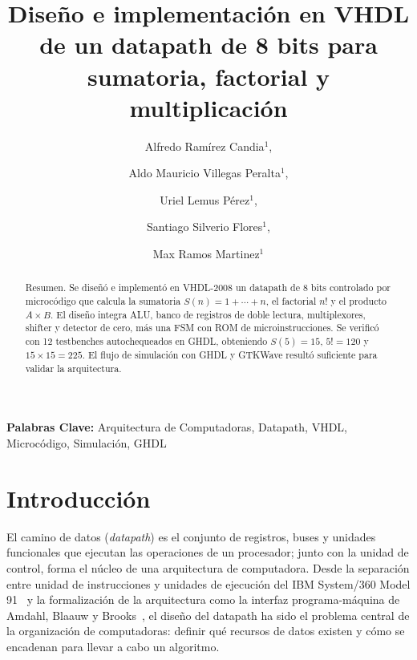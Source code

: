 \documentclass[llncs]{llncs}
\begin{document}
\title{Diseño e implementación en VHDL de un datapath
de 8 bits para sumatoria, factorial y multiplicación}

\author{Alfredo Ramírez Candia$^{1}$,%
\and Aldo Mauricio Villegas Peralta$^{1}$,%
\and Uriel Lemus Pérez$^{1}$,%
\and Santiago Silverio Flores$^{1}$,%
\and Max Ramos Martinez$^{1}$}


\maketitle

\begin{abstract}
Resumen. Se diseñó e implementó en VHDL-2008 un datapath de 8 bits
controlado por microcódigo que calcula la sumatoria $S(n)=1+\cdots+n$, el
factorial $n!$ y el producto $A\times B$. El diseño integra ALU, banco de
registros de doble lectura, multiplexores, shifter y detector de cero, más una
FSM con ROM de microinstrucciones. Se verificó con 12 testbenches autochequeados
en GHDL, obteniendo $S(5)=15$, $5!=120$ y $15\times15=225$. El flujo de
simulación con GHDL y GTKWave resultó suficiente para validar la arquitectura.
\end{abstract}

\noindent\textbf{Palabras Clave:} Arquitectura de Computadoras, Datapath,
VHDL, Microcódigo, Simulación, GHDL

\section{Introducción}
\label{sec:intro}

El camino de datos (\emph{datapath}) es el conjunto de registros, buses y
unidades funcionales que ejecutan las operaciones de un procesador; junto con
la unidad de control, forma el núcleo de una arquitectura de computadora.
Desde la separación entre unidad de instrucciones y unidades de ejecución del
IBM System/360 Model 91~\cite{anderson1967,anderson1967fp,flynn1967} y la
formalización de la arquitectura como la interfaz programa-máquina de
Amdahl, Blaauw y
Brooks~\cite{amdahl1964}, el diseño del datapath ha sido el problema central
de la organización de computadoras: definir qué recursos de datos existen y
cómo se encadenan para llevar a cabo un algoritmo.
\end{document}
